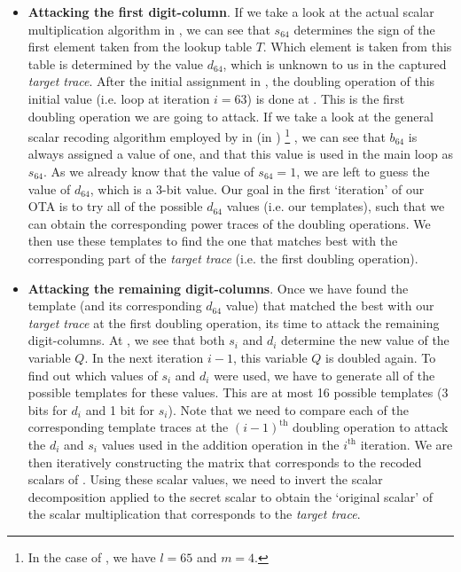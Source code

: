 \begin{itemize}
	\item \textbf{Attacking the first digit-column}. 
	If we take a look at the actual scalar multiplication algorithm in , we can see that $s_{64}$ determines the sign of the first element taken from the lookup table $T$.
	Which element is taken from this table is determined by the value $d_{64}$, which is unknown to us in the captured \emph{target trace}.
	After the initial assignment in , the doubling operation of this initial value (i.e. loop at iteration $i = 63$) is done at .
	This is the first doubling operation we are going to attack.
	If we take a look at the general scalar recoding algorithm employed by {\fourq} in  (in )%
	\footnote{In the case of \fourq, we have $l = 65$ and $m = 4$.}
	, we can see that $b_{64}$ is always assigned a value of one, and that this value is used in the main loop as $s_{64}$.
	As we already know that the value of $s_{64} = 1$, we are left to guess the value of $d_{64}$, which is a 3-bit value.
	Our goal in the first `iteration' of our OTA is to try all of the possible $d_{64}$ values (i.e. our templates), such that we can obtain the corresponding power traces of the doubling operations.
	We then use these templates to find the one that matches best with the corresponding part of the \emph{target trace} (i.e. the first doubling operation).
	
	\item \textbf{Attacking the remaining digit-columns}. Once we have found the template (and its corresponding $d_{64}$ value) that matched the best with our \emph{target trace} at the first doubling operation, its time to attack the remaining digit-columns.
	At , we see that both $s_i$ and $d_i$ determine the new value of the variable $Q$. 
	In the next iteration $i - 1$, this variable $Q$ is doubled again. To find out which values of $s_i$ and $d_i$ were used, we have to generate all of the possible templates for these values. This are at most 16 possible templates (3 bits for $d_i$ and 1 bit for $s_i$).
	Note that we need to compare each of the corresponding template traces at the $(i - 1)^\mathrm{th}$ doubling operation to attack the $d_i$ and $s_i$ values used in the addition operation in the $i^\mathrm{th}$ iteration.
	We are then iteratively constructing the matrix that corresponds to the recoded scalars of {\fourq}.
	Using these scalar values, we need to invert the scalar decomposition applied to the secret scalar to obtain the `original scalar' of the scalar multiplication that corresponds to the \emph{target trace}.  
	

\end{itemize}

